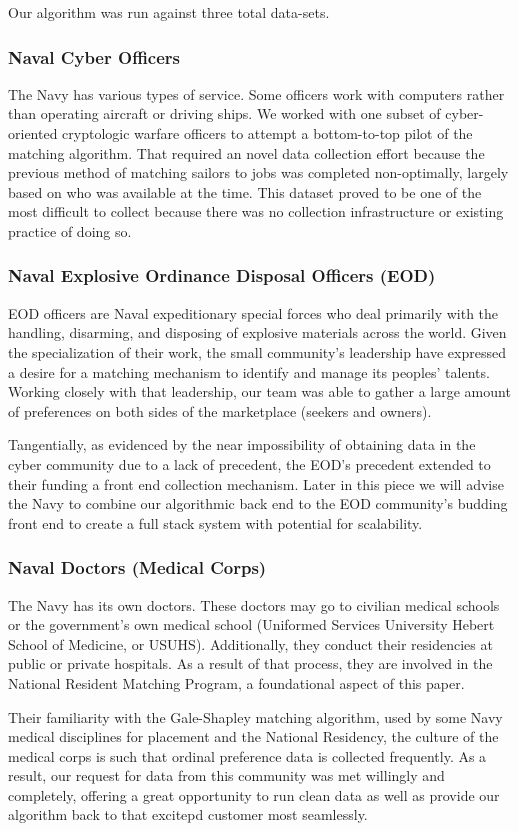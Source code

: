 Our algorithm was run against three total data-sets. 

\subsubsection{Naval Cyber Officers}

The Navy has various types of service.  Some officers work with computers rather than operating aircraft or driving ships. We worked with one subset of cyber-oriented cryptologic warfare officers to attempt a bottom-to-top pilot of the matching algorithm.  That required an novel data collection effort because the previous method of matching sailors to jobs was completed non-optimally, largely based on who was available at the time. This dataset proved to be one of the most difficult to collect because there was no collection infrastructure or existing practice of doing so. 

\subsubsection{Naval Explosive Ordinance Disposal Officers (EOD)}

EOD officers are Naval expeditionary special forces who deal primarily with the handling, disarming, and disposing of explosive materials across the world. Given the specialization of their work, the small community’s leadership have expressed a desire for a matching mechanism to identify and manage its peoples’ talents.  Working closely with that leadership, our team was able to gather a large amount of preferences on both sides of the marketplace (seekers and owners).  

Tangentially, as evidenced by the near impossibility of obtaining data in the cyber community due to a lack of precedent, the EOD’s precedent extended to their funding a front end collection mechanism.  Later in this piece we will advise the Navy to combine our algorithmic back end to the EOD community’s budding front end to create a full stack system with potential for scalability.  

\subsubsection{Naval Doctors (Medical Corps)}

The Navy has its own doctors. These doctors may go to civilian medical schools or the government’s own medical school (Uniformed Services University Hebert School of Medicine, or USUHS).  Additionally, they conduct their residencies at public or private hospitals.  As a result of that process, they are involved in the National Resident Matching Program, a foundational aspect of this paper. 

Their familiarity with the Gale-Shapley matching algorithm, used by some Navy medical disciplines for placement and the National Residency, the culture of the medical corps is such that ordinal preference data is collected frequently.  As a result, our request for data from this community was met willingly and completely, offering a great opportunity to run clean data as well as provide our algorithm back to that excitepd customer most seamlessly. 

